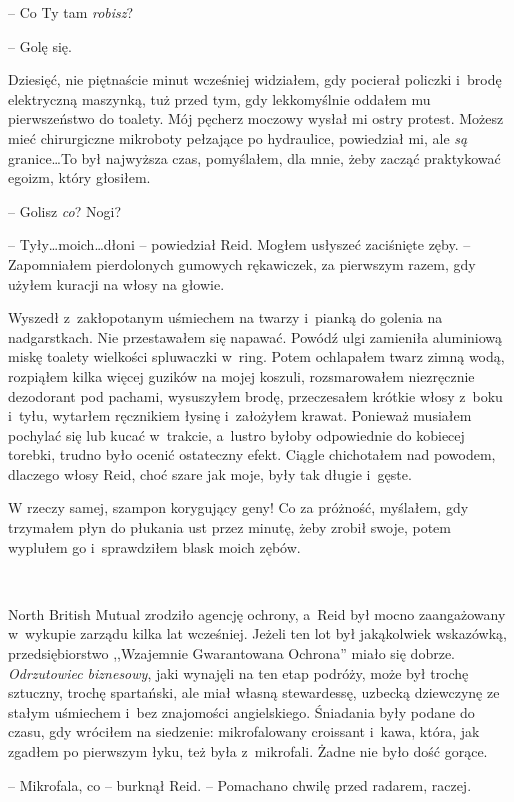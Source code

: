 \documentclass[oneside,polish,11pt,sfheadings]{mwbk}
\begin{document}
-- Co Ty tam \emph{robisz}?

-- Golę się.

Dziesięć, nie piętnaście minut wcześniej widziałem, gdy pocierał
policzki i~brodę elektryczną maszynką, tuż przed tym, gdy lekkomyślnie
oddałem mu pierwszeństwo do toalety. Mój pęcherz moczowy wysłał mi ostry
protest. Możesz mieć chirurgiczne mikroboty pełzające po hydraulice,
powiedział mi, ale \emph{są} granice\ldots To był najwyższa czas,
pomyślałem, dla mnie, żeby zacząć praktykować egoizm, który głosiłem.

-- Golisz \emph{co}? Nogi?

-- Tyły\ldots moich\ldots dłoni -- powiedział Reid. Mogłem usłyszeć zaciśnięte
zęby. -- Zapomniałem pierdolonych gumowych rękawiczek, za pierwszym razem, gdy
użyłem kuracji na włosy na głowie.

Wyszedł z~zakłopotanym uśmiechem na twarzy i~pianką do golenia na
nadgarstkach. Nie przestawałem się napawać. Powódź ulgi zamieniła
aluminiową miskę toalety wielkości spluwaczki w~ring. Potem ochlapałem
twarz zimną wodą, rozpiąłem kilka więcej guzików na mojej koszuli,
rozsmarowałem niezręcznie dezodorant pod pachami, wysuszyłem brodę,
przeczesałem krótkie włosy z~boku i~tyłu, wytarłem ręcznikiem łysinę i~założyłem krawat. Ponieważ musiałem pochylać się lub kucać w~trakcie, a~lustro byłoby odpowiednie do kobiecej torebki, trudno było ocenić
ostateczny efekt. Ciągle chichotałem nad powodem, dlaczego włosy Reid,
choć szare jak moje, były tak długie i~gęste.

W rzeczy samej, szampon korygujący geny! Co za próżność, myślałem, gdy
trzymałem płyn do płukania ust przez minutę, żeby zrobił swoje, potem
wyplułem go i~sprawdziłem blask moich zębów.

~

North British Mutual zrodziło agencję ochrony, a~Reid był mocno
zaangażowany w~wykupie zarządu kilka lat wcześniej. Jeżeli ten lot był
jakąkolwiek wskazówką, przedsiębiorstwo ,,Wzajemnie Gwarantowana
Ochrona'' miało się dobrze. \emph{Odrzutowiec biznesowy}, jaki wynajęli
na ten etap podróży, może był trochę sztuczny, trochę spartański, ale
miał własną stewardessę, uzbecką dziewczynę ze stałym uśmiechem i~bez
znajomości angielskiego. Śniadania były podane do czasu, gdy wróciłem na
siedzenie: mikrofalowany croissant i~kawa, która, jak zgadłem po
pierwszym łyku, też była z~mikrofali. Żadne nie było dość gorące.

-- Mikrofala, co -- burknął Reid. -- Pomachano chwilę przed radarem,
raczej.
\end{document}
